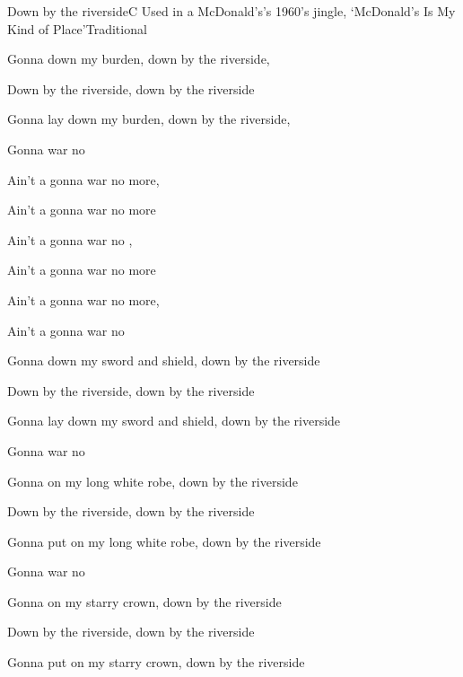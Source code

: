 \begin{SBSong}{Down by the riverside}{C}
    {Used in a McDonald's's 1960's jingle, `McDonald's Is My Kind of Place'}{Traditional}
  \begin{SBVerse}
    Gonna  down my burden, down by the riverside,
    
    Down by the riverside, down by the riverside

    Gonna lay down my burden, down by the riverside,

    Gonna  war no 
  \end{SBVerse}
  \begin{SBChorus}
    Ain't a gonna  war no more, 

    Ain't a gonna  war no more

    Ain't a gonna  war no , 

    Ain't a gonna  war no more

    Ain't a gonna  war no more, 

    Ain't a gonna  war no   
  \end{SBChorus}
  \begin{SBVerse}
    Gonna  down my sword and shield,  down by the riverside

    Down by the riverside, down by the riverside

    Gonna lay down my sword and shield, down by the riverside

    Gonna  war no 
  \end{SBVerse}
  \begin{SBVerse}
    Gonna  on my long white robe, down by the riverside

    Down by the riverside, down by the riverside

    Gonna put on my long white robe, down by the riverside

    Gonna  war no 
  \end{SBVerse}
  \begin{SBVerse}
    Gonna  on my starry crown, down by the riverside

    Down by the riverside, down by the riverside
    
    Gonna put on my starry crown, down by the riverside


\end{SBVerse}
\end{SBSong}
